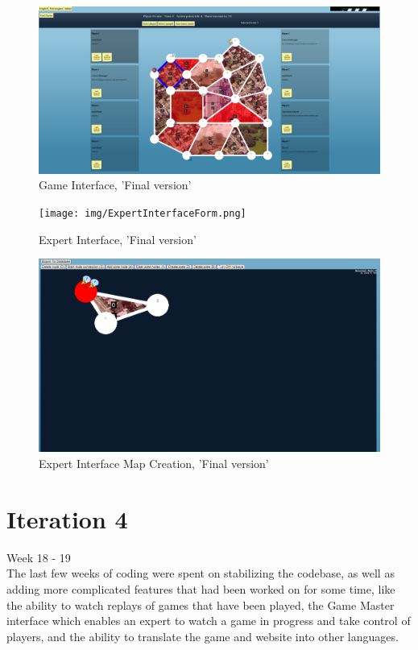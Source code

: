 \begin{figure}[H]
  \centering
    \includegraphics[width=1.0\textwidth]{img/gamefinal.png}
  \caption{Game Interface, 'Final version'} 
  \label{fig:gamefinal}
\end{figure}

\begin{figure}[H]
  \centering
    \texttt{[image: img/ExpertInterfaceForm.png]}
  \caption{Expert Interface, 'Final version'} 
  \label{fig:EcpertInterfaceForm}
\end{figure}


\begin{figure}[H]
  \centering
    \includegraphics[width=1.0\textwidth]{img/ExpertInterfaceCanvas.png}
  \caption{Expert Interface Map Creation, 'Final version'} 
  \label{fig:EcpertInterfaceCanvas}
\end{figure}

\section{Iteration 4}

Week 18 - 19\\
\newline
The last few weeks of coding were spent on stabilizing the codebase, as well as adding more complicated features that had been worked on for some time, like the ability to watch replays of games that have been played, the Game Master interface which enables an expert to watch a game in progress and take control of players, and the ability to translate the game and website into other languages.\\


